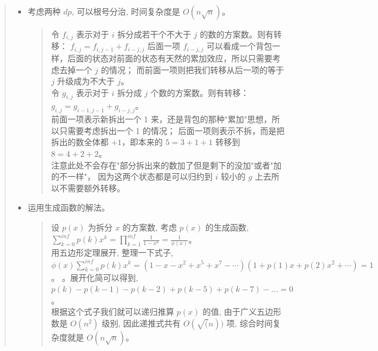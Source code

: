 \documentclass[a4paper,12pt]{article}
\begin{document}
\begin{itemize}
\begin{quote}
            \begin{itemize}
                \item
                考虑两种 \( dp \), 可以根号分治, 时间复杂度是 \(O(n \sqrt{n})\)。

                \begin{quote}
                令 \( f_{i,j} \) 表示对于 \( i \) 拆分成若干个不大于 \( j \) 的数的方案数。则有转移：
                \(f_{i,j} = f_{i,j-1} + f_{i-j,j}\) 后面一项 \( f_{i-j,j} \) 可以看成一个背包一样，后面的状态对前面的状态有天然的累加效应，所以只需要考虑去掉一个 \( j \) 的情况；
                而前面一项则把我们转移从后一项的等于 \( j \) 升级成为不大于 \( j \)。
                \\
                
                令 \( g_{i,j} \) 表示对于 \( i \) 拆分成 \( j \) 个数的方案数。则有转移：
                \(g_{i,j} = g_{i-1,j-1} + g_{i-j,j}\)。
                \\
    
                前面一项表示新拆出一个 1 来，还是背包的那种"累加"思想，所以只需要考虑拆出一个 1 的情况；
                后面一项则表示不拆，而是把拆出的数全体都 \( +1 \)，即本来的 \( 5 = 3 + 1 + 1 \) 转移到 \( 8 = 4 + 2 + 2 \)。
                \\
                
                注意此处不会存在"部分拆出来的数加了但是剩下的没加"或者"加的不一样"，
                因为这两个状态都是可以归约到 \( i \) 较小的 \( g \) 上去所以不需要额外转移。
                \\
                \end{quote}

                \item 
                运用生成函数的解法。

                \begin{quote}
                    设 \(p(x)\) 为拆分 \(x\) 的方案数, 考虑 \(p(x)\) 的生成函数, 
                    \(\sum_{k=0}^{inf} p(k) x^k = \prod_{k=1}^{inf} \frac{1}{1 - x^k} = \frac{1}{\phi(x)}\)。
                    \\    

                    用五边形定理展开, 整理一下式子, 
                    \(\phi(x) \sum_{k=0}^{inf} p(k) x^k = (1 - x - x^2 + x^5 + x^7 - \cdots )(1 + p(1)x + p(2)x^2 + \cdots ) = 1\)。
                    。展开化简可以得到, \(p(k) - p(k-1) - p(k-2) + p(k-5) + p(k-7) - ... = 0\)。
                    \\
                    
                    根据这个式子我们就可以递归推算 \(p(x)\) 的值, 由于广义五边形数是 \(O(n^2)\) 级别,
                    因此递推式共有 \(O(\sqrt(n))\) 项, 综合时间复杂度就是 \(O(n \sqrt{n})\)。
                \end{quote}

            \end{itemize}
            
        \end{quote}
\end{itemize}
\end{document}
